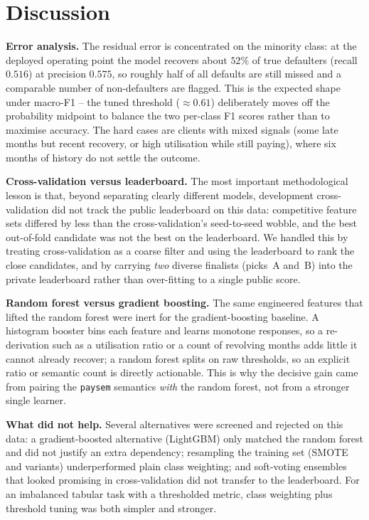 \documentclass[conference]{IEEEtran}
\begin{document}
\section{Discussion}
\textbf{Error analysis.} The residual error is concentrated on the minority class:
at the deployed operating point the model recovers about $52\%$ of true defaulters
(recall $0.516$) at precision $0.575$, so roughly half of all defaults are still
missed and a comparable number of non-defaulters are flagged. This is the expected
shape under macro-F1 -- the tuned threshold ($\approx 0.61$) deliberately moves off
the probability midpoint to balance the two per-class F1 scores rather than to
maximise accuracy. The hard cases are clients with mixed signals (some late months
but recent recovery, or high utilisation while still paying), where six months of
history do not settle the outcome.

\textbf{Cross-validation versus leaderboard.} The most important methodological
lesson is that, beyond separating clearly different models, development
cross-validation did not track the public leaderboard on this data: competitive
feature sets differed by less than the cross-validation's seed-to-seed wobble, and
the best out-of-fold candidate was not the best on the leaderboard. We handled this
by treating cross-validation as a coarse filter and using the leaderboard to rank
the close candidates, and by carrying \emph{two} diverse finalists (picks~A and~B)
into the private leaderboard rather than over-fitting to a single public score.

\textbf{Random forest versus gradient boosting.} The same engineered features that
lifted the random forest were inert for the gradient-boosting baseline. A
histogram booster bins each feature and learns monotone responses, so a
re-derivation such as a utilisation ratio or a count of revolving months adds
little it cannot already recover; a random forest splits on raw thresholds, so an
explicit ratio or semantic count is directly actionable. This is why the decisive
gain came from pairing the \texttt{paysem} semantics \emph{with} the random forest,
not from a stronger single learner.

\textbf{What did not help.} Several alternatives were screened and rejected on this
data: a gradient-boosted alternative (LightGBM) only matched the random forest and
did not justify an extra dependency; resampling the training set (SMOTE and
variants) underperformed plain class weighting; and soft-voting ensembles that
looked promising in cross-validation did not transfer to the leaderboard. For an
imbalanced tabular task with a thresholded metric, class weighting plus threshold
tuning was both simpler and stronger.
\end{document}
